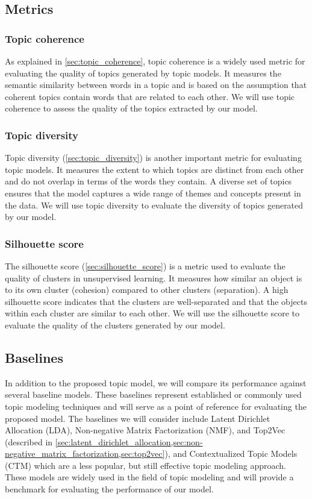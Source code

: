 \subsection{Metrics}
\subsubsection{Topic coherence}
As explained in \cref{sec:topic_coherence}, topic coherence is a widely used metric for evaluating the quality of topics generated by topic models. It measures the semantic similarity between words in a topic and is based on the assumption that coherent topics contain words that are related to each other. We will use topic coherence to assess the quality of the topics extracted by our model.

\subsubsection{Topic diversity}
Topic diversity (\cref{sec:topic_diversity}) is another important metric for evaluating topic models. It measures the extent to which topics are distinct from each other and do not overlap in terms of the words they contain. A diverse set of topics ensures that the model captures a wide range of themes and concepts present in the data. We will use topic diversity to evaluate the diversity of topics generated by our model.

\subsubsection{Silhouette score}
The silhouette score (\cref{sec:silhouette_score}) is a metric used to evaluate the quality of clusters in unsupervised learning. It measures how similar an object is to its own cluster (cohesion) compared to other clusters (separation). A high silhouette score indicates that the clusters are well-separated and that the objects within each cluster are similar to each other. We will use the silhouette score to evaluate the quality of the clusters generated by our model.

\subsection{Baselines}
In addition to the proposed topic model, we will compare its performance against several baseline models. These baselines represent established or commonly used topic modeling techniques and will serve as a point of reference for evaluating the proposed model. The baselines we will consider include Latent Dirichlet Allocation (LDA), Non-negative Matrix Factorization (NMF), and Top2Vec (described in \cref{sec:latent_dirichlet_allocation,sec:non-negative_matrix_factorization,sec:top2vec}), and Contextualized Topic Models (CTM) \cite{bianchi_pre-training_2021, bianchi_cross-lingual_2021} which are a less popular, but still effective topic modeling approach. These models are widely used in the field of topic modeling and will provide a benchmark for evaluating the performance of our model.

